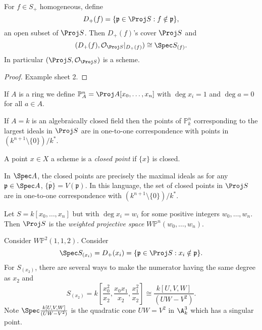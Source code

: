 \documentclass[a4paper]{article}
\renewcommand*{\P}{\mathbb{P}}
\newcommand{\sh}[1]{\mathcal{#1}} %
\begin{document}
\begin{proposition}
  For \(f \in S_+\) homogeneous, define
  \[
    D_+(f) = \{\mathfrak p \in \Proj S: f \notin \mathfrak p\},
  \]
  an open subset of \(\Proj S\). Then \(D_+(f)\)'s cover \(\Proj S\) and
  \[
    (D_+(f), \sh O_{\Proj S}|_{D_+(f)}) \cong \Spec S_{(f)}.
  \]
  In particular \((\Proj S, \sh O_{\Proj S})\) is a scheme.
\end{proposition}

\begin{proof}
  Example sheet 2.
\end{proof}

\begin{definition}
  If \(A\) is a ring we define \(\P_A^n = \Proj A[x_0, \dots, x_n]\) with \(\deg x_i = 1\) and \(\deg a = 0\) for all \(a \in A\).
\end{definition}

If \(A = k\) is an algebraically closed field then the points of \(\P_k^n\) corresponding to the largest ideals in \(\Proj S\) are in one-to-one correspondence with points in \((k^{n + 1} \setminus \{0\})/k^*\).

\begin{definition}
  A point \(x \in X\) a scheme is a \emph{closed point} if \(\{x\}\) is closed.
\end{definition}

In \(\Spec A\), the closed points are precisely the maximal ideals as for any \(\mathfrak p \in \Spec A\), \(\overline{\{\mathfrak p\}} = V(\mathfrak p)\). In this language, the set of closed points in \(\Proj S\) are in one-to-one correspondence with \((k^{n + 1}\setminus \{0\})/k^*\).

\begin{eg}
  Let \(S = k[x_0, \dots, x_n]\) but with \(\deg x_i = w_i\) for some positive integers \(w_0, \dots, w_n\). Then \(\Proj S\) is the \emph{weighted projective space} \(W\P^n(w_0, \dots, w_n)\).

  Consider \(W\P^2(1, 1, 2)\). Consider
  \[
    \Spec S_{(x_i)} = D_+(x_i) = \{\mathfrak p \in \Proj S: x_i \notin \mathfrak p\}.
  \]
  For \(S_{(x_2)}\), there are several ways to make the numerator having the same degree as \(x_2\) and
  \[
    S_{(x_2)} = k[\frac{x_0^2}{x_2}, \frac{x_0x_1}{x_2}, \frac{x_1^2}{x_2}] \cong \frac{k[U, V, W]}{(UW - V^2)}.
  \]
  Note \(\Spec \frac{k[U, V, W]}{(UW - V^2)}\) is the quadratic cone \(UW = V^2\) in \(\A_k^3\) which has a singular point.
\end{eg}
\end{document}
